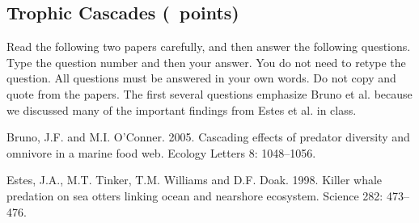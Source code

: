 \documentclass[11pt, addpoints]{exam}
\begin{document}
\subsection*{Trophic Cascades (\numpoints\ points)}

Read the following two papers carefully, and then answer the following questions. Type the question number and then your answer. You do not need to retype the question. All questions must be answered in your own words. Do not copy and quote from the papers. The first several questions emphasize Bruno et al. because we discussed many of the important findings from Estes et al. in class.\vspace{\baselineskip}

\begin{hangparas}{1.5em}{1}
Bruno, J.F. and M.I. O’Conner. 2005. Cascading effects of predator diversity and omnivore in a marine food web. Ecology Letters 8: 1048--1056.\vspace{\baselineskip}

Estes, J.A., M.T. Tinker, T.M. Williams and D.F. Doak. 1998. Killer whale predation on sea otters linking ocean and nearshore ecosystem. Science 282: 473--476.
\end{hangparas}
\end{document}
